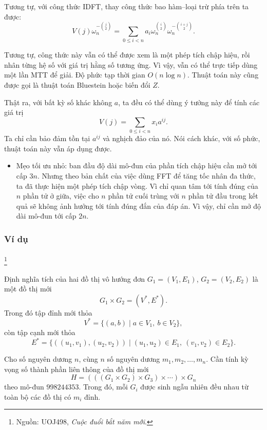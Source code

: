 \documentclass[11pt]{article}
\begin{document}
Tương tự, với công thức IDFT, thay công thức bao hàm--loại trừ phía trên ta
được:
\[
V(j)\omega_n^{-\binom j2}
=\sum_{0\le i<n}a_i\omega_n^{\binom i2}\omega_n^{-\binom{i+j}{2}}.
\]

Tương tự, công thức này vẫn có thể được xem là một phép tích chập hiệu, rồi
nhân từng hệ số với giá trị hằng số tương ứng. Vì vậy, vẫn có thể trực tiếp
dùng một lần MTT để giải. Độ phức tạp thời gian \(O(n\log n)\). Thuật toán này
cũng được gọi là thuật toán Bluestein hoặc biến đổi \(Z\).

Thật ra, với bất kỳ số khác không \(a\), ta đều có thể dùng ý tưởng này để tính
các giá trị
\[
V(j)=\sum_{0\le i<n}x_i a^{ij}.
\]
Ta chỉ cần bảo đảm tồn tại \(a^{ij}\) và nghịch đảo của nó. Nói cách khác, với
số phức, thuật toán này vẫn áp dụng được.

\begin{itemize}
  \item Mẹo tối ưu nhỏ: ban đầu độ dài mô-đun của phần tích chập hiệu cần mở
  tới cấp \(3n\). Nhưng theo bản chất của việc dùng FFT để tăng tốc nhân đa
  thức, ta đã thực hiện một phép tích chập vòng. Vì chỉ quan tâm tới tính đúng
  của \(n\) phần tử ở giữa, việc cho \(n\) phần tử cuối trùng với \(n\) phần tử
  đầu trong kết quả sẽ không ảnh hưởng tới tính đúng đắn của đáp án. Vì vậy,
  chỉ cần mở độ dài mô-đun tới cấp \(2n\).
\end{itemize}

\subsubsection{Ví dụ}

\paragraph{}\footnote{Nguồn: UOJ498, \emph{Cuộc đuổi bắt năm
mới}.}

 Định nghĩa tích của hai đồ thị vô hướng đơn
\(G_1=(V_1,E_1)\), \(G_2=(V_2,E_2)\) là một đồ thị mới
\[
G_1\times G_2=(V^*,E^*).
\]
Trong đó tập đỉnh mới thỏa
\[
V^*=\{(a,b)\mid a\in V_1,\ b\in V_2\},
\]
còn tập cạnh mới thỏa
\[
E^*=\{((u_1,v_1),(u_2,v_2))\mid (u_1,u_2)\in E_1,\ (v_1,v_2)\in E_2\}.
\]

Cho số nguyên dương \(n\), cùng \(n\) số nguyên dương
\(m_1,m_2,\ldots,m_n\). Cần tính kỳ vọng số thành phần liên thông của đồ thị mới
\[
H=(((G_1\times G_2)\times G_3)\times\cdots)\times G_n
\]
theo mô-đun \(998244353\). Trong đó, mỗi \(G_i\) được sinh ngẫu nhiên đều nhau
từ toàn bộ các đồ thị có \(m_i\) đỉnh.
\end{document}
